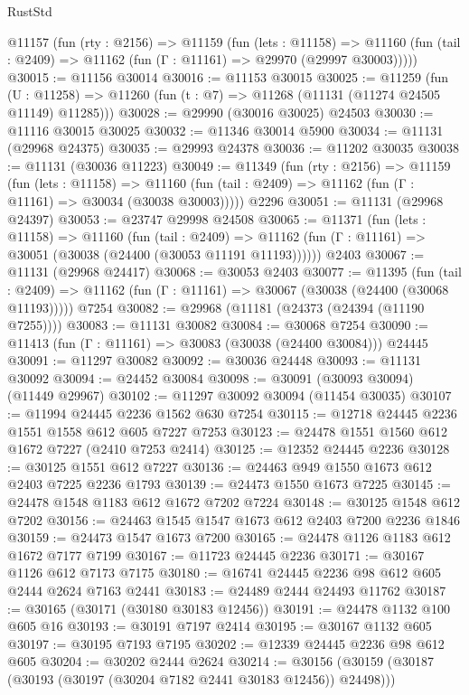 \begin{lexlean}{RustStd}
\begin{coremodule}
  @11157
    (fun (rty : @2156) =>
    @11159
      (fun (lets : @11158) =>
      @11160 (fun (tail : @2409) => @11162 (fun (Γ : @11161) => @29970 (@29997 @30003)))))
@30015 := @11156 @30014
@30016 := @11153 @30015
@30025 := @11259
    (fun (U : @11258) => @11260 (fun (t : @7) => @11268 (@11131 (@11274 @24505 @11149) @11285)))
@30028 := @29990 (@30016 @30025) @24503
@30030 := @11116 @30015 @30025
@30032 := @11346 @30014 @5900
@30034 := @11131 (@29968 @24375)
@30035 := @29993 @24378
@30036 := @11202 @30035
@30038 := @11131 (@30036 @11223)
@30049 := @11349
    (fun (rty : @2156) =>
    @11159
      (fun (lets : @11158) =>
      @11160 (fun (tail : @2409) => @11162 (fun (Γ : @11161) => @30034 (@30038 @30003)))))
    @2296
@30051 := @11131 (@29968 @24397)
@30053 := @23747 @29998 @24508
@30065 := @11371
    (fun (lets : @11158) =>
    @11160
      (fun (tail : @2409) =>
      @11162 (fun (Γ : @11161) => @30051 (@30038 (@24400 (@30053 @11191 @11193))))))
    @2403
@30067 := @11131 (@29968 @24417)
@30068 := @30053 @2403
@30077 := @11395
    (fun (tail : @2409) => @11162 (fun (Γ : @11161) => @30067 (@30038 (@24400 (@30068 @11193)))))
    @7254
@30082 := @29968 (@11181 (@24373 (@24394 (@11190 @7255))))
@30083 := @11131 @30082
@30084 := @30068 @7254
@30090 := @11413 (fun (Γ : @11161) => @30083 (@30038 (@24400 @30084))) @24445
@30091 := @11297 @30082
@30092 := @30036 @24448
@30093 := @11131 @30092
@30094 := @24452 @30084
@30098 := @30091 (@30093 @30094) (@11449 @29967)
@30102 := @11297 @30092 @30094 (@11454 @30035)
@30107 := @11994 @24445 @2236 @1562 @630 @7254
@30115 := @12718 @24445 @2236 @1551 @1558 @612 @605 @7227 @7253
@30123 := @24478 @1551 @1560 @612 @1672 @7227 (@2410 @7253 @2414)
@30125 := @12352 @24445 @2236
@30128 := @30125 @1551 @612 @7227
@30136 := @24463 @949 @1550 @1673 @612 @2403 @7225 @2236 @1793
@30139 := @24473 @1550 @1673 @7225
@30145 := @24478 @1548 @1183 @612 @1672 @7202 @7224
@30148 := @30125 @1548 @612 @7202
@30156 := @24463 @1545 @1547 @1673 @612 @2403 @7200 @2236 @1846
@30159 := @24473 @1547 @1673 @7200
@30165 := @24478 @1126 @1183 @612 @1672 @7177 @7199
@30167 := @11723 @24445 @2236
@30171 := @30167 @1126 @612 @7173 @7175
@30180 := @16741 @24445 @2236 @98 @612 @605 @2444 @2624 @7163 @2441
@30183 := @24489 @2444 @24493 @11762
@30187 := @30165 (@30171 (@30180 @30183 @12456))
@30191 := @24478 @1132 @100 @605 @16
@30193 := @30191 @7197 @2414
@30195 := @30167 @1132 @605
@30197 := @30195 @7193 @7195
@30202 := @12339 @24445 @2236 @98 @612 @605
@30204 := @30202 @2444 @2624
@30214 := @30156 (@30159 (@30187 (@30193 (@30197 (@30204 @7182 @2441 @30183 @12456)) @24498)))

\end{coremodule}
\end{lexlean}
